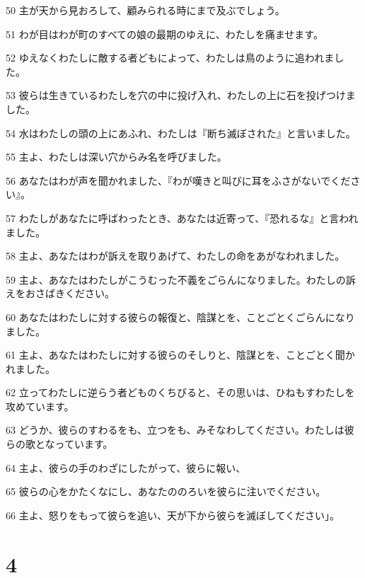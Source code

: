 \par 50 主が天から見おろして、顧みられる時にまで及ぶでしょう。
\par 51 わが目はわが町のすべての娘の最期のゆえに、わたしを痛ませます。
\par 52 ゆえなくわたしに敵する者どもによって、わたしは鳥のように追われました。
\par 53 彼らは生きているわたしを穴の中に投げ入れ、わたしの上に石を投げつけました。
\par 54 水はわたしの頭の上にあふれ、わたしは『断ち滅ぼされた』と言いました。
\par 55 主よ、わたしは深い穴からみ名を呼びました。
\par 56 あなたはわが声を聞かれました、『わが嘆きと叫びに耳をふさがないでください』。
\par 57 わたしがあなたに呼ばわったとき、あなたは近寄って、『恐れるな』と言われました。
\par 58 主よ、あなたはわが訴えを取りあげて、わたしの命をあがなわれました。
\par 59 主よ、あなたはわたしがこうむった不義をごらんになりました。わたしの訴えをおさばきください。
\par 60 あなたはわたしに対する彼らの報復と、陰謀とを、ことごとくごらんになりました。
\par 61 主よ、あなたはわたしに対する彼らのそしりと、陰謀とを、ことごとく聞かれました。
\par 62 立ってわたしに逆らう者どものくちびると、その思いは、ひねもすわたしを攻めています。
\par 63 どうか、彼らのすわるをも、立つをも、みそなわしてください。わたしは彼らの歌となっています。
\par 64 主よ、彼らの手のわざにしたがって、彼らに報い、
\par 65 彼らの心をかたくなにし、あなたののろいを彼らに注いでください。
\par 66 主よ、怒りをもって彼らを追い、天が下から彼らを滅ぼしてください」。

\chapter{4}

